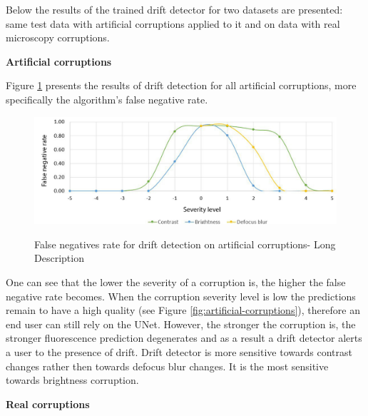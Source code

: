 Below the results of the trained drift detector for two datasets are presented: same test data with artificial corruptions applied to it and on data with real microscopy corruptions. 

\textbf{Artificial corruptions}

Figure \ref{fig:fn-rate} presents the results of drift detection for all artificial corruptions, more specifically the algorithm's false negative rate.
\begin{figure}[htb]
	\begin{center}
		\includegraphics[width=\linewidth]{bilder/drift-detection/fn-rate.png}
		\caption[False negatives rate for drift detection on artificial corruptions]%
		{False negatives rate for drift detection on artificial corruptions- Long Description}{}\label{fig:fn-rate}
	\end{center}
\end{figure}
One can see that the lower the severity of a corruption is, the higher the false negative rate becomes. When the corruption severity level is low the predictions remain to have a high quality (see Figure \ref{fig:artificial-corruptions}), therefore an end user can still rely on the UNet. However, the stronger the corruption is, the stronger fluorescence prediction degenerates and as a result a drift detector alerts a user to the presence of drift. Drift detector is more sensitive towards contrast changes rather then towards defocus blur changes. It is the most sensitive towards brightness corruption.

\textbf{Real corruptions}

